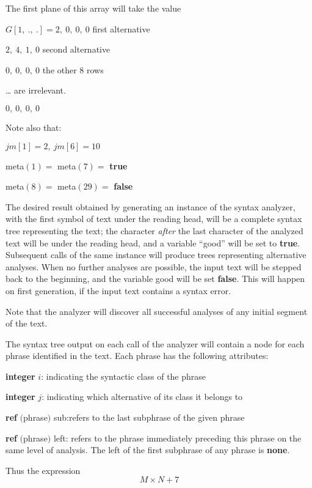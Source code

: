 \noindent
The first plane of this array will take the value

\quad $G[1,\ .,\ .] = 2,\ 0,\ 0,\ 0$\tabto*{12em} first alternative

\tabto*{7.4em}$2,\ 4,\ 1,\ 0$\tabto*{12em} second alternative

\tabto*{7.4em}$0,\ 0,\ 0,\ 0$\tabto*{12em} the other 8 rows

\tabto*{7.4em}\quad\dots\tabto*{12em} are irrelevant.

\tabto*{7.4em}$0,\ 0,\ 0,\ 0$

Note also that:

\quad $jm[1] = 2,\ jm[6] = 10$

\quad meta$(1) =$ meta$(7) =$ \textbf{true}

\quad meta$(8) =$ meta$(29) =$ \textbf{false}

The desired result obtained by generating an instance of the syntax analyzer, with the first symbol of text under the reading head, will be a complete syntax tree representing the text; the character \textit{after} the last character of the analyzed text will be under the reading head, and a variable ``good'' will be set to \textbf{true}. Subsequent calls of the same instance will produce trees representing alternative analyses. When no further analyses are possible, the input text will be stepped back to the beginning, and the variable good will be set \textbf{false}. This will happen on first generation, if the input text contains a syntax error.

Note that the analyzer will discover all successful analyses of any initial segment of the text.

The syntax tree output on each call of the analyzer will contain a node for each phrase identified in the text. Each phrase has the following attributes:

\quad \textbf{integer} $i$: indicating the syntactic class of the phrase

\quad \textbf{integer} $j$: indicating which alternative of its class it belongs to

\quad \textbf{ref} $($phrase$)$ sub:refers to the last subphrase of the given phrase

\parindent\quad \textbf{ref} $($phrase$)$ left: refers to the phrase immediately preceding this phrase on the same level of analysis. The left of the first subphrase of any phrase is \textbf{none}.

\noindent
Thus the expression
$$
M\times N + 7
$$

